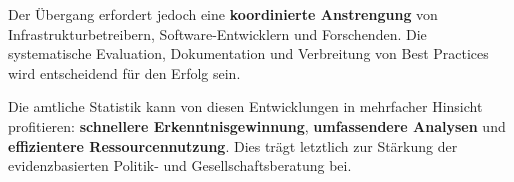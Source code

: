\documentclass[
  ngerman,
  10pt,
  letterpaper,
  twocolumn]{book}
\begin{document}
Der Übergang erfordert jedoch eine \textbf{koordinierte Anstrengung} von
Infrastrukturbetreibern, Software-Entwicklern und Forschenden. Die
systematische Evaluation, Dokumentation und Verbreitung von Best
Practices wird entscheidend für den Erfolg sein.

Die amtliche Statistik kann von diesen Entwicklungen in mehrfacher
Hinsicht profitieren: \textbf{schnellere Erkenntnisgewinnung},
\textbf{umfassendere Analysen} und \textbf{effizientere
Ressourcennutzung}. Dies trägt letztlich zur Stärkung der
evidenzbasierten Politik- und Gesellschaftsberatung bei.


\backmatter
\printbibliography
\end{document}
